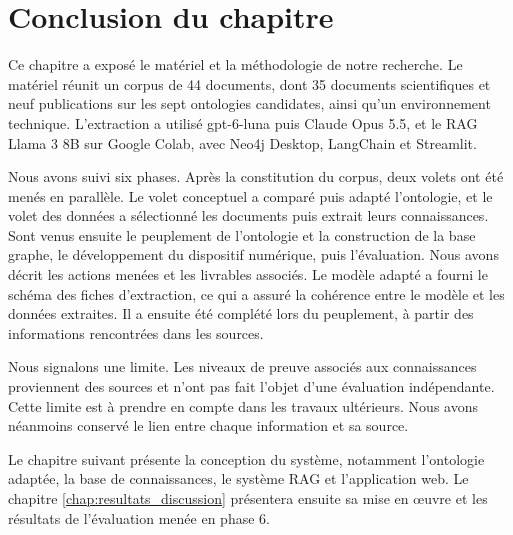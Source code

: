 
\section*{Conclusion du chapitre}

Ce chapitre a exposé le matériel et la méthodologie de notre recherche. Le matériel réunit un corpus de 44 documents, dont 35 documents scientifiques et neuf publications sur les sept ontologies candidates, ainsi qu'un environnement technique. L'extraction a utilisé gpt-6-luna puis Claude Opus 5.5, et le RAG Llama 3 8B sur Google Colab, avec Neo4j Desktop, LangChain et Streamlit.

Nous avons suivi six phases. Après la constitution du corpus, deux volets ont été menés en parallèle. Le volet conceptuel a comparé puis adapté l'ontologie, et le volet des données a sélectionné les documents puis extrait leurs connaissances. Sont venus ensuite le peuplement de l'ontologie et la construction de la base graphe, le développement du dispositif numérique, puis l'évaluation. Nous avons décrit les actions menées et les livrables associés. Le modèle adapté a fourni le schéma des fiches d'extraction, ce qui a assuré la cohérence entre le modèle et les données extraites. Il a ensuite été complété lors du peuplement, à partir des informations rencontrées dans les sources.

Nous signalons une limite. Les niveaux de preuve associés aux connaissances proviennent des sources et n'ont pas fait l'objet d'une évaluation indépendante. Cette limite est à prendre en compte dans les travaux ultérieurs. Nous avons néanmoins conservé le lien entre chaque information et sa source.

Le chapitre suivant présente la conception du système, notamment l'ontologie adaptée, la base de connaissances, le système RAG et l'application web. Le chapitre \ref{chap:resultats_discussion} présentera ensuite sa mise en œuvre et les résultats de l'évaluation menée en phase 6.
